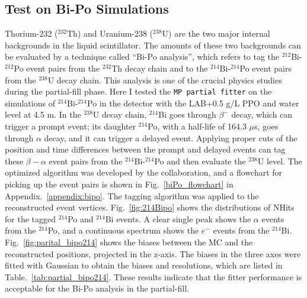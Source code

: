 \subsection{Test on Bi-Po Simulations}
Thorium-232 ($^{232}$Th) and Uranium-238 ($^{238}$U) are the two major internal backgrounds in the liquid scintillator. The amounts of these two backgrounds can be evaluated by a technique called ``Bi-Po analysis'', which refers to tag the $^{212}$Bi-$^{212}$Po event pairs from the $^{232}$Th decay chain and to the $^{214}$Bi-$^{214}$Po event pairs from the $^{238}$U decay chain. This analysis is one of the crucial physics studies during the partial-fill phase. Here I tested the \texttt{MP partial fitter} on the simulations of $^{214}$Bi-$^{214}$Po in the detector with the LAB+0.5 g/L PPO and water level at 4.5 m. In the $^{238}$U decay chain, $^{214}$Bi goes through $\beta^-$ decay, which can trigger a prompt event\cite{nndc}; its daughter $^{214}$Po, with a half-life of 164.3 $\mu$s, goes through $\alpha$ decay, and it can trigger a delayed event. Applying proper cuts of the position and time differences between the prompt and delayed events can tag these $\beta-\alpha$ event pairs from the $^{214}$Bi-$^{214}$Po and then evaluate the $^{238}$U level. The optimized algorithm was developed by the collaboration\cite{joshW1}, and a flowchart for picking up the event pairs is shown in Fig.~\ref{biPo_flowchart} in Appendix.~\ref{appendix:bipo}.
The tagging algorithm was applied to the reconstructed event vertices. Fig.~\ref{fig:214Bipo} shows the distributions of NHits for the tagged $^{214}$Po and $^{214}$Bi events. A clear single peak shows the $\alpha$ events from the $^{214}$Po, and a continuous spectrum shows the $e^-$ events from the $^{214}$Bi. Fig.~\ref{fig:parital_bipo214} shows the biases between the MC and the reconstructed positions, projected in the z-axis. The biases in the three axes were fitted with Gaussian to obtain the biases and resolutions, which are listed in Table.~\ref{tab:partial_bipo214}. These results indicate that the fitter performance is acceptable for the Bi-Po analysis in the partial-fill.

